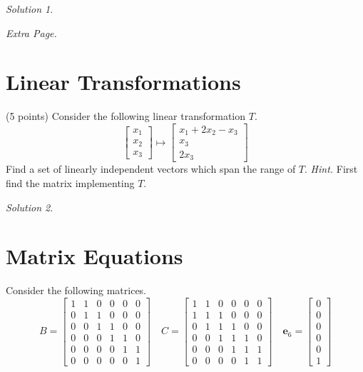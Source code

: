 \documentclass{article}
\theoremstyle{remark}
\newtheorem*{solution}{Solution}
\newcommand{\vv}[1]{\mathbf{#1}}
\begin{document}
\begin{solution}
\end{solution}
\vfill

\pagebreak
\noindent\textit{Extra Page.}

\pagebreak
\section{Linear Transformations}

(5 points) Consider the following linear transformation $T$.
\begin{displaymath}
  \begin{bmatrix}
    x_1 \\ x_2 \\ x_3
  \end{bmatrix}
  \mapsto
  \begin{bmatrix}
    x_1 + 2x_2 - x_3 \\
    x_3 \\
    2x_3
  \end{bmatrix}
\end{displaymath}
Find a set of linearly independent vectors which span the range of $T$. \textit{Hint.} First find the matrix implementing $T$.

\begin{solution}
\end{solution}

\pagebreak
\section{Matrix Equations}
Consider the following matrices.
\begin{displaymath}
  B =
  \begin{bmatrix}
    1 & 1 & 0 & 0 & 0 & 0 \\
    0 & 1 & 1 & 0 & 0 & 0 \\
    0 & 0 & 1 & 1 & 0 & 0 \\
    0 & 0 & 0 & 1 & 1 & 0 \\
    0 & 0 & 0 & 0 & 1 & 1 \\
    0 & 0 & 0 & 0 & 0 & 1
  \end{bmatrix}
  \quad
  C =
  \begin{bmatrix}
    1 & 1 & 0 & 0 & 0 & 0 \\
    1 & 1 & 1 & 0 & 0 & 0 \\
    0 & 1 & 1 & 1 & 0 & 0 \\
    0 & 0 & 1 & 1 & 1 & 0 \\
    0 & 0 & 0 & 1 & 1 & 1 \\
    0 & 0 & 0 & 0 & 1 & 1
  \end{bmatrix}
  \quad
  \vv e_6 =
  \begin{bmatrix}
    0 \\ 0 \\ 0 \\ 0 \\ 0 \\ 1
  \end{bmatrix}
\end{displaymath}
\end{document}
